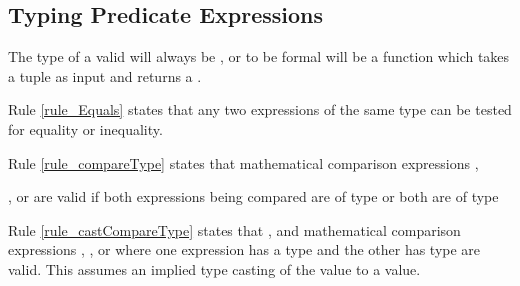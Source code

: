\subsection{Typing Predicate Expressions}

The type of a valid  will always be , or to be formal will be a function which takes a tuple as input and returns a .

Rule \ref{rule_Equals} states that any two expressions of the same type can be tested for equality or inequality.


Rule \ref{rule_compareType} states that mathematical comparison expressions ,

\noindent {},  or  are valid if both expressions being compared are of type  or both are of type 


Rule \ref{rule_castCompareType} states that ,  and mathematical comparison expressions , 
,  or  where one expression has a type  and the other has type  are valid.
This assumes an implied type casting of the  value to a  value.

